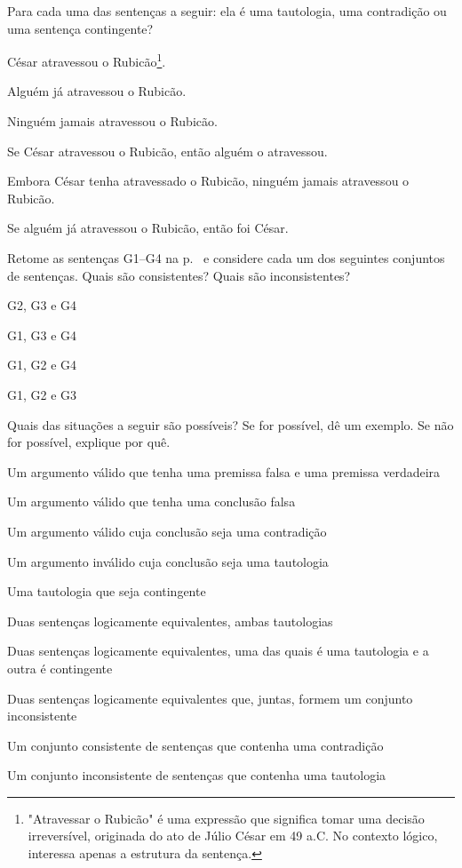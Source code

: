 \problempart
\label{pr.EnglishTautology}
Para cada uma das sentenças a seguir: ela é uma tautologia, uma contradição ou uma sentença contingente?
\begin{earg}
\item César atravessou o Rubicão\footnote{"Atravessar o Rubicão" é uma expressão que significa tomar uma decisão irreversível, originada do ato de Júlio César em 49 a.C. No contexto lógico, interessa apenas a estrutura da sentença.}.
\item Alguém já atravessou o Rubicão.
\item Ninguém jamais atravessou o Rubicão.
\item Se César atravessou o Rubicão, então alguém o atravessou.
\item Embora César tenha atravessado o Rubicão, ninguém jamais atravessou o Rubicão.
\item Se alguém já atravessou o Rubicão, então foi César.
\end{earg}

\solutions
\problempart
\label{pr.MartianGiraffes}
Retome as sentenças G1--G4 na p.~\pageref{MartianGiraffes} e considere cada um dos seguintes conjuntos de sentenças. Quais são consistentes? Quais são inconsistentes?
\begin{earg}
\item G2, G3 e G4
\item G1, G3 e G4
\item G1, G2 e G4
\item G1, G2 e G3
\end{earg}

\solutions
\problempart
\label{pr.EnglishCombinations}
Quais das situações a seguir são possíveis? Se for possível, dê um exemplo. Se não for possível, explique por quê.
\begin{earg}
\item Um argumento válido que tenha uma premissa falsa e uma premissa verdadeira
\item Um argumento válido que tenha uma conclusão falsa
\item Um argumento válido cuja conclusão seja uma contradição
\item Um argumento inválido cuja conclusão seja uma tautologia
\item Uma tautologia que seja contingente
\item Duas sentenças logicamente equivalentes, ambas tautologias
\item Duas sentenças logicamente equivalentes, uma das quais é uma tautologia e a outra é contingente
\item Duas sentenças logicamente equivalentes que, juntas, formem um conjunto inconsistente
\item Um conjunto consistente de sentenças que contenha uma contradição
\item Um conjunto inconsistente de sentenças que contenha uma tautologia
\end{earg}
